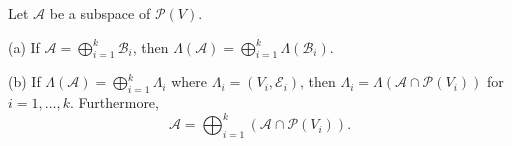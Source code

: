 Let $\mathcal{A}$ be a subspace of $\mathcal{P}(V)$.

(a) If $\mathcal{A} = \bigoplus_{i=1}^{k} \mathcal{B}_i$, then $\Lambda(\mathcal{A}) = \bigoplus_{i=1}^{k} \Lambda(\mathcal{B}_i)$.

(b) If $\Lambda(\mathcal{A}) = \bigoplus_{i=1}^{k} \Lambda_i$ where $\Lambda_i = (V_i, \mathcal{E}_i)$, then $\Lambda_i = \Lambda(\mathcal{A} \cap \mathcal{P}(V_i))$ for $i = 1, \ldots, k$. Furthermore,
$$\mathcal{A} = \bigoplus_{i=1}^{k} (\mathcal{A} \cap \mathcal{P}(V_i)).$$
